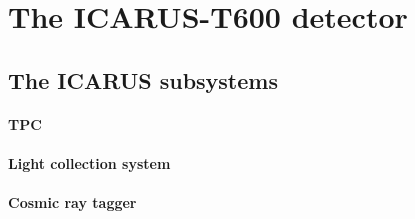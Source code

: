 \section{The ICARUS-T600 detector} 



\subsection{The ICARUS subsystems} 

\paragraph{TPC} 

\begin{figure}
    \centering
    \hspace{1em}
    \caption[ICARUS TPC wires and field cage]{}
    \label{fig:ICARUS_photo}
\end{figure}

\paragraph{Light collection system} 

\paragraph{Cosmic ray tagger} 




